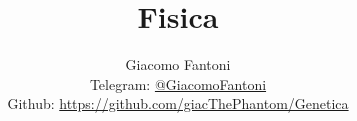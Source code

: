 

\title{\Huge \textbf{Fisica}}

\author{
  Giacomo Fantoni \\
  \small Telegram: \href{https://t.me/GiacomoFantoni}{@GiacomoFantoni} \\[3pt]
  \small Github: \href{https://github.com/giacThePhantom/Genetica}{https://github.com/giacThePhantom/Genetica}}


	\maketitle
	\tableofcontents
	


